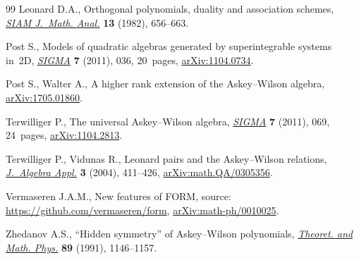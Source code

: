 \documentclass[pdftex]{sigma}
\numberwithin{equation}{section}
\theoremstyle{definition}
\begin{document}
\begin{thebibliography}{99}
Leonard D.A., Orthogonal polynomials, duality and association schemes,
 \href{https://doi.org/10.1137/0513044}{\textit{SIAM J.~Math. Anal.}} \textbf{13} (1982), 656--663.

Post S., Models of quadratic algebras generated by superintegrable systems
 in~2{D}, \href{https://doi.org/10.3842/SIGMA.2011.036}{\textit{SIGMA}} \textbf{7} (2011), 036, 20~pages, \href{https://arxiv.org/abs/#2}{arXiv:1104.0734}.

Post S., Walter A., A higher rank extension of the {A}skey--{W}ilson algebra,
 \href{https://arxiv.org/abs/1705.01860}{arXiv:1705.01860}.

Terwilliger P., The universal {A}skey--{W}ilson algebra, \href{https://doi.org/10.3842/SIGMA.2011.069}{\textit{SIGMA}}
 \textbf{7} (2011), 069, 24~pages, \href{https://arxiv.org/abs/1104.2813}{arXiv:1104.2813}.

Terwilliger P., Vidunas R., Leonard pairs and the {A}skey--{W}ilson relations,
 \href{https://doi.org/10.1142/S0219498804000940}{\textit{J.~Algebra Appl.}} \textbf{3} (2004), 411--426,
 \href{https://arxiv.org/abs/math.QA/0305356}{arXiv:math.QA/0305356}.

Vermaseren J.A.M., New features of {FORM}, source:
 \url{https://github.com/vermaseren/form}, \href{https://arxiv.org/abs/math-ph/0010025}{arXiv:math-ph/0010025}.

Zhedanov A.S., ``{H}idden symmetry'' of {A}skey--{W}ilson polynomials,
 \href{https://doi.org/10.1007/BF01015906}{\textit{Theoret. and Math. Phys.}} \textbf{89} (1991), 1146--1157.

\end{thebibliography}\LastPageEnding
\end{document}
